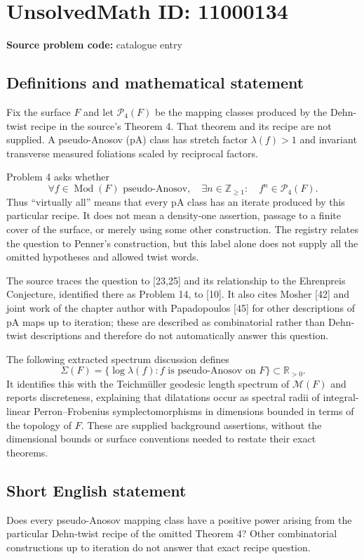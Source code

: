 \documentclass[11pt]{article}
\newcommand{\Z}{\mathbb{Z}}
\newcommand{\R}{\mathbb{R}}
\begin{document}
\section*{UnsolvedMath ID: 11000134}
\textbf{Source problem code:} catalogue entry
\subsection{Definitions and mathematical statement}
Fix the surface $F$ and let $\mathcal P_4(F)$ be the mapping classes produced by the Dehn-twist recipe in the source's Theorem 4. That theorem and its recipe are not supplied. A pseudo-Anosov (pA) class has stretch factor $\lambda(f)>1$ and invariant transverse measured foliations scaled by reciprocal factors.

Problem 4 asks whether
\[
 \forall f\in\operatorname{Mod}(F)\text{ pseudo-Anosov},\quad
 \exists n\in\Z_{\geq1}:\quad f^n\in\mathcal P_4(F).
\]
Thus ``virtually all'' means that every pA class has an iterate produced by this particular recipe. It does not mean a density-one assertion, passage to a finite cover of the surface, or merely using some other construction. The registry relates the question to Penner's construction, but this label alone does not supply all the omitted hypotheses and allowed twist words.

The source traces the question to [23,25] and its relationship to the Ehrenpreis Conjecture, identified there as Problem 14, to [10]. It also cites Mosher [42] and joint work of the chapter author with Papadopoulos [45] for other descriptions of pA maps up to iteration; these are described as combinatorial rather than Dehn-twist descriptions and therefore do not automatically answer this question.

The following extracted spectrum discussion defines
\[
 \Sigma(F)=\{\log\lambda(f):f\text{ is pseudo-Anosov on }F\}\subset\R_{>0}.
\]
It identifies this with the Teichm\"uller geodesic length spectrum of $\mathcal M(F)$ and reports discreteness, explaining that dilatations occur as spectral radii of integral-linear Perron--Frobenius symplectomorphisms in dimensions bounded in terms of the topology of $F$. These are supplied background assertions, without the dimensional bounds or surface conventions needed to restate their exact theorems.
\subsection{Short English statement}
Does every pseudo-Anosov mapping class have a positive power arising from the particular Dehn-twist recipe of the omitted Theorem 4? Other combinatorial constructions up to iteration do not answer that exact recipe question.
\end{document}

